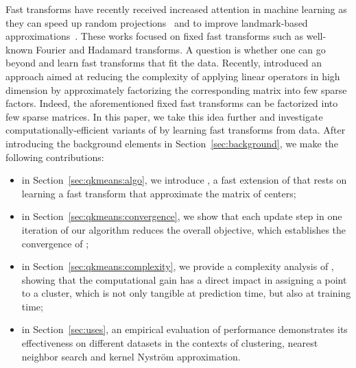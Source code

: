 Fast transforms have recently received increased attention in machine learning as they can speed up random projections~\cite{le2013fastfood,gittens2016revisiting} and to improve landmark-based approximations~\cite{si2016computationally}.
%
These works focused on fixed fast transforms such as well-known Fourier and Hadamard transforms.
A question is whether one can go beyond and learn fast transforms that fit the data. 
%
Recently, \citet{LeMagoarou2016Flexible} introduced an approach aimed  at  reducing the  complexity  of  applying  linear  operators  in  high  dimension by   approximately   factorizing   the   corresponding   matrix   into few   sparse   factors. 
Indeed, the aforementioned fixed fast transforms can be factorized into few sparse matrices.
%
In this paper, we take this idea further and investigate computationally-efficient variants of \kmeans by learning fast transforms from data.
%
After introducing the background elements in Section~\ref{sec:background}, we make the following contributions:
\begin{itemize}
	\item in Section~\ref{sec:qkmeans:algo}, we introduce \qkmeans, a fast extension of \kmeans that rests on learning a fast transform that approximate the matrix of centers;
	\item in Section~\ref{sec:qkmeans:convergence}, we show that each update step in one iteration of our algorithm  reduces the overall objective, which establishes the convergence of \qkmeans;
	\item in Section~\ref{sec:qkmeans:complexity}, we provide a complexity analysis of \qkmeans, showing that the computational gain has a direct impact in assigning a point to a cluster, which is not only tangible at prediction time, but also at training time;
	\item in Section~\ref{sec:uses}, an empirical evaluation of \qkmeans  performance demonstrates its effectiveness on different datasets in the contexts of clustering, nearest neighbor search and kernel Nystr\"om approximation.
\end{itemize}


